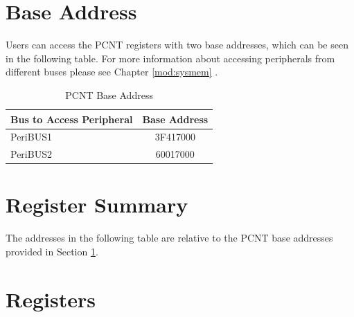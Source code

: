 \documentclass[main\_\_EN.tex]{subfiles}
\begin{document}
\section{Base Address}\label{subsection:PCNT_base_address}
Users can access the PCNT registers with two base addresses, which can be seen in the following table. For more information about accessing peripherals from different buses please see Chapter \ref{mod:sysmem} \textit{}.

\begin{longtable}[c]{ | l |c| }
\caption{PCNT Base Address}\label{table:PCNT_base_address}
\\\hline
\rowcolor{lightgray}
Bus to Access Peripheral & Base Address \\
    \hline
PeriBUS1 & \hexprefix{}3F417000 \\
    \hline
PeriBUS2 & \hexprefix{}60017000 \\
    \hline
\end{longtable}

\hypertarget{pcnt-reg-summ}{}
\section{Register Summary}

The addresses in the following table are relative to the PCNT base addresses provided in Section \ref{subsection:PCNT_base_address}.

\section{Registers}

\end{document}
